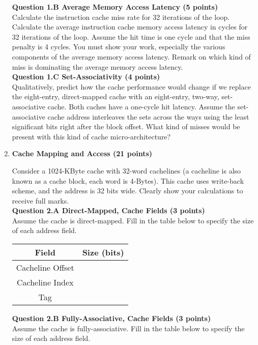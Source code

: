 \documentclass[a4paper,10pt]{article}
\begin{document}
\begin{enumerate}
\textbf{Question 1.B Average Memory Access Latency (5 points)}\\
Calculate the instruction cache miss rate for 32 iterations of the loop. Calculate the average instruction cache memory access latency in cycles for 32 iterations of the loop. Assume the hit time is one cycle and that the miss penalty is 4 cycles. You must show your work, especially the various components of the average memory access latency. Remark on which kind of miss is dominating the average memory access latency.\\


\textbf{Question 1.C Set-Associativity (4 points)}\\
Qualitatively, predict how the cache performance would change if we replace the eight-entry, direct-mapped cache with an eight-entry, two-way, set-associative cache. Both caches have a one-cycle hit latency. Assume the set-associative cache address interleaves the sets across the ways using the least significant bits right after the block offset. What kind of misses would be present with this kind of cache micro-architecture?\\




\item \textbf{Cache Mapping and Access (21 points)} 

Consider a 1024-KByte cache with 32-word cachelines (a cacheline is also known as a cache block, each word is 4-Bytes). This cache uses write-back scheme, and the address is 32 bits wide. Clearly show your calculations to receive full marks. \\

\textbf{Question 2.A Direct-Mapped, Cache Fields (3 points)}\\
Assume the cache is direct-mapped. Fill in the table below to specify the size of each address field.\\

\begin{center}
\begin{tabular}{cc}
\toprule  
\textbf{Field} & \textbf{ Size (bits)} \\
\midrule  
Cacheline Offset& \\
\midrule
Cacheline Index& \\
\midrule
Tag& \\
\bottomrule 
\end{tabular}
\end{center}


\textbf{Question 2.B Fully-Associative, Cache Fields (3 points)}\\
Assume the cache is fully-associative. Fill in the table below to specify the size of each address field.\\


\end{enumerate}
\end{document}

